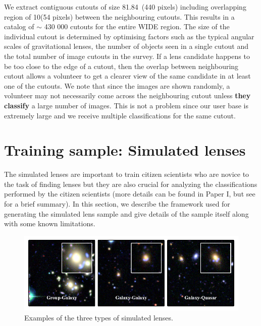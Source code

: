 \documentclass[useAMS,usenatbib,a4paper]{mn2e}
\begin{document}
We extract contiguous cutouts of size 81.84\arcsec\ (440 pixels) including
overlapping region of 10\arcsec (54 pixels) between the neighbouring
cutouts. This  results in a catalog of $\sim$ 430 000 cutouts for the entire \cfhtls
WIDE region. The size of the individual cutout is determined by
optimising factors such as the typical angular scales of gravitational
lenses, the number of objects seen in a single cutout and the total
number of image cutouts in the survey. If a lens
candidate happens to be too close to the edge of a cutout, then the overlap
between neighbouring cutout allows a volunteer to get a clearer view
of the same candidate in at least one of the cutouts. We note that since
the images are shown randomly, a volunteer may not necessarily come
across the neighbouring cutout unless {\bf they classify} a large
number of images. This is not a problem since our user base is extremely
large and we receive multiple classifications for the same cutout.


\section{Training sample: Simulated lenses}
\label{sec:ts}

The simulated lenses are important to train citizen scientists who are
novice to the task of finding lenses but they are also crucial for
analyzing the classifications performed by the citizen scientists (more
details can be found in Paper I, but see  for a brief
summary). In this section, we describe the framework used for generating the
simulated lens sample and give details of the sample itself along with
some known limitations.

\begin{figure}
\begin{center}
\includegraphics[scale=1.0]{sim_cgq.pdf}
\caption{ \label{fig:sim}
Examples of the three types of simulated lenses.
}
\end{center}
\end{figure}
\end{document}

